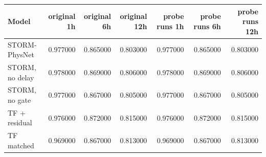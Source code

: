\begin{tabular}{lrrrrrr}
\toprule
Model & original 1h & original 6h & original 12h & probe runs 1h & probe runs 6h & probe runs 12h \\
\midrule
STORM-PhysNet & 0.977000 & 0.865000 & 0.803000 & 0.977000 & 0.865000 & 0.803000 \\
STORM, no delay & 0.978000 & 0.869000 & 0.806000 & 0.978000 & 0.869000 & 0.806000 \\
STORM, no gate & 0.977000 & 0.867000 & 0.805000 & 0.977000 & 0.867000 & 0.805000 \\
TF + residual & 0.976000 & 0.872000 & 0.815000 & 0.976000 & 0.872000 & 0.815000 \\
TF matched & 0.969000 & 0.867000 & 0.813000 & 0.969000 & 0.867000 & 0.813000 \\
\bottomrule
\end{tabular}
